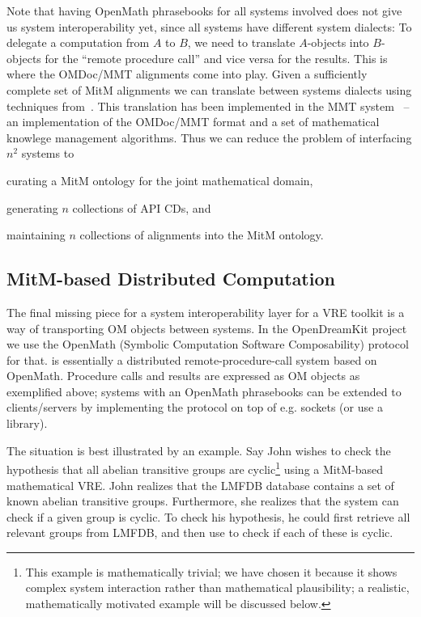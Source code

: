 Note that having OpenMath phrasebooks for all systems involved does not give us system interoperability yet, since all systems have different system dialects: 
To delegate a computation from $A$ to $B$, we need to translate $A$-objects into $B$-objects for the ``remote procedure call'' and vice versa for the results. This is where the OMDoc/MMT alignments come into play. 
Given a sufficiently complete set of MitM alignments we can translate between systems dialects using techniques from~\cite{MueRoYuRa:abtafs17}. This translation has been implemented in the MMT system~\cite{Rabe:MAGMS13,uniformal:on}   -- an implementation of the OMDoc/MMT format and a set of mathematical knowlege management algorithms. 
Thus we can reduce the problem of  interfacing $n^2$ systems to
\begin{inparaenum}[\em i\rm)]
\item curating a MitM ontology for the joint mathematical domain,
\item generating $n$ collections of API CDs, and 
\item maintaining $n$ collections of alignments into the MitM ontology.
\end{inparaenum}

\subsection{MitM-based Distributed Computation}\label{sec:mitm:comms}

The final missing piece for a system interoperability layer for a VRE toolkit is a way of transporting OM objects between systems. 
In the OpenDreamKit project we use the OpenMath \SCSCP (Symbolic Computation Software Composability) protocol~\cite{SCSCP-1.3} for that. 
\SCSCP is essentially a distributed remote-procedure-call system based on OpenMath. 
Procedure calls and results are expressed as OM objects as exemplified above; systems with an OpenMath phrasebooks can be extended to  \SCSCP clients/servers by implementing the \SCSCP protocol on top of e.g. sockets (or use a \SCSCP library). 

The situation is best illustrated by an example. Say John wishes to check the hypothesis that all abelian transitive groups are cyclic\footnote{This example is mathematically trivial; we have chosen it because it shows complex system interaction rather than mathematical plausibility; a realistic, mathematically motivated example will be discussed below.} using a MitM-based mathematical VRE.
John realizes that the LMFDB database contains a set of known abelian transitive groups.
Furthermore, she realizes that the \GAP system can check if a given group is cyclic. 
To check his hypothesis, he could first retrieve all relevant groups from LMFDB, and then use \GAP to check if each of these is cyclic. 

